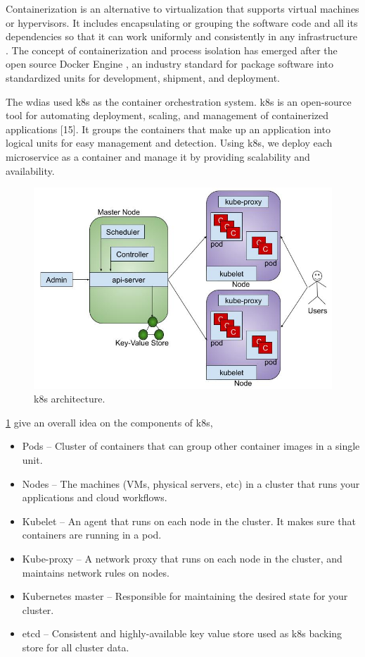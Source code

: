 Containerization is an alternative to virtualization that supports virtual machines or hypervisors. It includes encapsulating or grouping the software code and all its dependencies so that it can work uniformly and consistently in any infrastructure \cite{IBMContainerizationExplained}. The concept of containerization and process isolation has emerged after the open source Docker Engine \cite{DockerAppContainerization}, an industry standard for package software into standardized units for development, shipment, and deployment.

The \acrshort{wdias} used \acrfull{k8s} as the container orchestration system. \acrshort{k8s} is an open-source tool for automating deployment, scaling, and management of containerized applications [15]. It groups the containers that make up an application into logical units for easy management and detection. Using \acrshort{k8s}, we deploy each microservice as a container and manage it by providing scalability and availability.

\begin{figure}[htp]
    \centering
    \includegraphics[width=1\textwidth]{method/microservice/k8s_architecture_v3.jpg}
    \caption{\acrfull{k8s} architecture.}
    \label{fi:k8s_architecture}
\end{figure}

\cref{fi:k8s_architecture} give an overall idea on the components of \acrshort{k8s},
\begin{itemize}
    \item Pods -- Cluster of containers that can group other container images in a single unit.
    \item Nodes -- The machines (VMs, physical servers, etc) in a cluster that runs your applications and cloud workflows.
    \item Kubelet -- An agent that runs on each node in the cluster. It makes sure that containers are running in a pod.
    \item Kube-proxy -- A network proxy that runs on each node in the cluster, and maintains network rules on nodes.
    \item Kubernetes master -- Responsible for maintaining the desired state for your cluster.
    \item etcd -- Consistent and highly-available key value store used as \acrshort{k8s} backing store for all cluster data.
\end{itemize}

